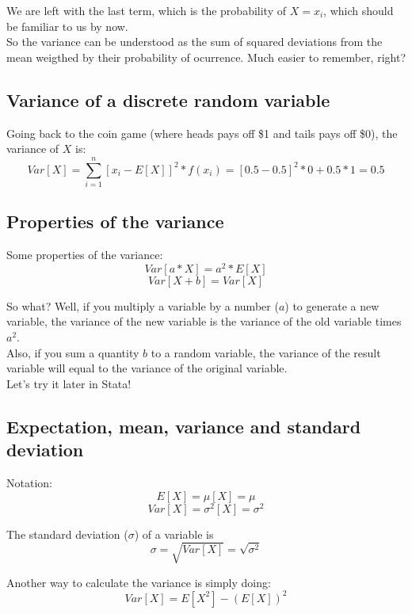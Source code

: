 \documentclass[11pt]{article}
\begin{document}
	We are left with the last term, which is the probability of $X = x_i$, which should be familiar to us by now.\\
	
	So the variance can be understood as the sum of squared deviations from the mean weigthed by their probability of ocurrence. Much easier to remember, right?

	\subsection*{Variance of a discrete random variable}
	Going back to the coin game (where heads pays off \$1 and tails pays off \$0), the variance of $X$ is:
	\[Var[X] = \sum\limits_{i=1}^n[x_i - E[X]]^2 * f(x_i) = [0.5 - 0.5]^2 * 0 + 0.5 * 1 = 0.5\]


	\subsection*{Properties of the variance}
	
	Some properties of the variance:
	\[Var[a*X] = a^2 * E[X]\]
	\[Var[X+ b] = Var[X]\]
	
	So what? Well, if you multiply a variable by a number ($a$) to generate a new variable, the variance of the new variable is the variance of the old variable times $a^2$.\\
	
	Also, if you sum a quantity $b$ to a random variable, the variance of the result variable will equal to the variance of the original variable.\\
	
	Let's try it later in Stata!

	\subsection*{Expectation, mean, variance and standard deviation}

	Notation:
	\[E[X] = \mu[X] = \mu\]
	\[Var[X] = \sigma^2[X] = \sigma^2\]

	The standard deviation ($\sigma$) of a variable is
	\[\sigma = \sqrt{Var[X]} = \sqrt{\sigma^2}\]

	Another way to calculate the variance is simply doing: 
	\[Var[X] = E[X^2] - (E[X])^2\]	
\end{document}
